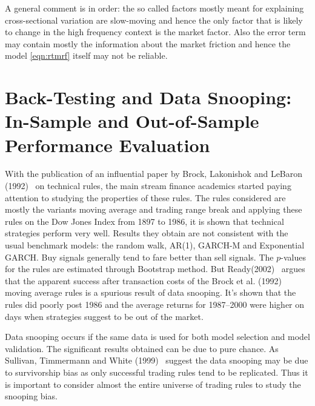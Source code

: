 A general comment is in order: the so called factors mostly meant for explaining cross-sectional variation are slow-moving and hence the only factor that is likely to change in the high frequency context is the market factor. Also the error term may contain mostly the information about the market friction and hence the model \eqref{eqn:rtmrf} itself may not be reliable.



\section{Back-Testing and Data Snooping:  In-Sample and Out-of-Sample Performance Evaluation}


With the publication of an influential paper by Brock, Lakonishok and LeBaron (1992)~\cite{BLL} on technical rules, the main stream finance academics started paying attention to studying the properties of these rules. The rules considered are mostly the variants moving average and trading range break and applying these rules on the Dow Jones Index from 1897 to 1986, it is shown that technical strategies perform very well. Results they obtain are not consistent with the usual benchmark models: the random walk, AR(1), GARCH-M and Exponential GARCH. Buy signals generally tend to fare better than sell signals. The $p$-values for the rules are estimated through Bootstrap method. But Ready(2002)~\cite{ready} argues that the apparent success after transaction costs of the Brock et al. (1992)~\cite{BLL} moving average rules is a spurious result of data snooping. It's shown that the rules did poorly post 1986 and the average returns for 1987--2000 were higher on days when strategies suggest to be out of the market.


Data snooping occurs if the same data is used for both model selection and model validation. The significant results obtained can be due to pure chance. As Sullivan, Timmermann and White (1999)~\cite{sullivan1999data} suggest the data snooping may be due to survivorship bias as only successful trading rules tend to be replicated. Thus it is important to consider almost the entire universe of trading rules to study the snooping bias.


